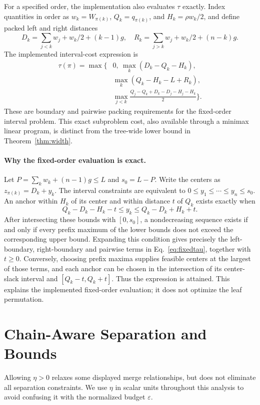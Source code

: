 \documentclass{vgtc}                %
\begin{document}
For a specified order, the implementation also evaluates $\tau$ exactly. Index quantities in order as $w_k=W_{\pi(k)}$, $Q_k=q_{\pi(k)}$, and $H_k=\rho w_k/2$, and define packed left and right distances
\[
 D_k=\sum_{j<k}w_j+w_k/2+(k-1)g,\quad
 R_k=\sum_{j>k}w_j+w_k/2+(n-k)g.
\]
The implemented interval-cost expression is
\begin{equation}\label{eq:fixedtau}
\begin{split}
\tau(\pi)=\max\bigg\{&0,\ \max_k(D_k-Q_k-H_k),\\
 &\max_k(Q_k-H_k-L+R_k),\\
 &\max_{j<k}\frac{Q_j-Q_k+D_k-D_j-H_j-H_k}{2}\bigg\}.
\end{split}
\end{equation}
These are boundary and pairwise packing requirements for the fixed-order interval problem. This exact subproblem cost, also available through a minimax linear program, is distinct from the tree-wide lower bound in Theorem~\ref{thm:width}.

\paragraph{Why the fixed-order evaluation is exact.}
Let $P=\sum_k w_k+(n-1)g\le L$ and $s_0=L-P$. Write the centers as $z_{\pi(k)}=D_k+y_k$. The interval constraints are equivalent to $0\le y_1\le\cdots\le y_n\le s_0$. An anchor within $H_k$ of its center and within distance $t$ of $Q_k$ exists exactly when
\[
 Q_k-D_k-H_k-t\le y_k\le Q_k-D_k+H_k+t.
\]
After intersecting these bounds with $[0,s_0]$, a nondecreasing sequence exists if and only if every prefix maximum of the lower bounds does not exceed the corresponding upper bound. Expanding this condition gives precisely the left-boundary, right-boundary and pairwise terms in Eq.~\ref{eq:fixedtau}, together with $t\ge0$. Conversely, choosing prefix maxima supplies feasible centers at the largest of those terms, and each anchor can be chosen in the intersection of its center-slack interval and $[Q_k-t,Q_k+t]$. Thus the expression is attained. This explains the implemented fixed-order evaluation; it does not optimize the leaf permutation.


\section{Chain-Aware Separation and Bounds}\label{sec:chain}
Allowing $\eta>0$ relaxes some displayed merge relationships, but does not eliminate all separation constraints. We use $\eta$ in scalar units throughout this analysis to avoid confusing it with the normalized budget $\varepsilon$.
\end{document}
